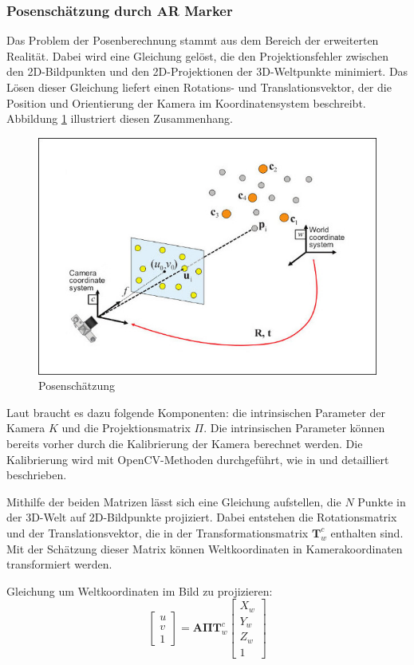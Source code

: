 \subsubsection{Posenschätzung durch AR Marker}
Das Problem der Posenberechnung stammt aus dem Bereich der erweiterten 
Realität. Dabei wird eine Gleichung gelöst, die den Projektionsfehler 
zwischen den 2D-Bildpunkten und den 2D-Projektionen der 3D-Weltpunkte minimiert. 
Das Lösen dieser Gleichung liefert einen Rotations- und Translationsvektor, der 
die Position und Orientierung der Kamera im Koordinatensystem beschreibt. 
Abbildung \ref{fig:pose} illustriert diesen Zusammenhang.

\begin{figure}[H]
    \centering
    \includegraphics[width=0.4\linewidth]{graphics/pose.png}
    \caption{Posenschätzung}
    \label{fig:pose}
\end{figure}

Laut \cite{pose} braucht es dazu folgende Komponenten: die intrinsischen Parameter 
der Kamera \( K \) und die Projektionsmatrix \( \Pi \). Die intrinsischen Parameter 
können bereits vorher durch die Kalibrierung der Kamera berechnet werden. Die Kalibrierung 
wird mit OpenCV-Methoden durchgeführt, wie in \cite{zhang} und \cite{bradski} detailliert 
beschrieben.

Mithilfe der beiden Matrizen lässt sich eine Gleichung aufstellen, die \( N \) Punkte 
in der 3D-Welt auf 2D-Bildpunkte projiziert. Dabei entstehen die Rotationsmatrix und der 
Translationsvektor, die in der Transformationsmatrix \(\mathbf{T}^c_{w}\) enthalten sind.
Mit der Schätzung dieser Matrix können Weltkoordinaten in Kamerakoordinaten transformiert 
werden.

Gleichung um Weltkoordinaten im Bild zu projizieren:
\[
\begin{bmatrix}
u \\ 
v \\ 
1
\end{bmatrix}
=
\mathbf{A} \mathbf{\Pi} \mathbf{T}^c_{w}
\begin{bmatrix}
X_w \\ 
Y_w \\ 
Z_w \\ 
1
\end{bmatrix}
\]

